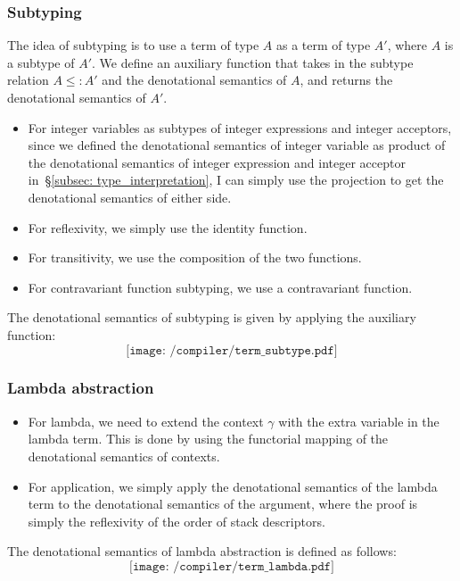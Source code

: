 \documentclass[12pt,a4paper]{report}
\theoremstyle{definition}
\newcommand{\secref}[1]{\S\ref{#1}}
\begin{document}
        \subsubsection{Subtyping}
        The idea of subtyping is to use a term of type $A$ as a term of type $A'$, where $A$ is a subtype of $A'$. We define an auxiliary function that takes in the subtype relation $A\leq:A'$ and the denotational semantics of $A$, and returns the denotational semantics of $A'$. 
        \begin{itemize}
            \item For integer variables as subtypes of integer expressions and integer acceptors, since we defined the denotational semantics of integer variable as product of the denotational semantics of integer expression and integer acceptor in~\secref{subsec: type_interpretation}, I can simply use the projection to get the denotational semantics of either side.
            \item For reflexivity, we simply use the identity function.
            \item For transitivity, we use the composition of the two functions.
            \item For contravariant function subtyping, we use a contravariant function.
        \end{itemize}
        The denotational semantics of subtyping is given by applying the auxiliary function:
        \[\texttt{[image: /compiler/term\_subtype.pdf]}\]

        \subsubsection{Lambda abstraction}
        \begin{itemize}
            \item For lambda, we need to extend the context $\gamma$ with the extra variable in the lambda term. This is done by using the functorial mapping of the denotational semantics of contexts.
            \item For application, we simply apply the denotational semantics of the lambda term to the denotational semantics of the argument, where the proof is simply the reflexivity of the order of stack descriptors.
        \end{itemize}
        The denotational semantics of lambda abstraction is defined as follows:
        \[\texttt{[image: /compiler/term\_lambda.pdf]}\]
\end{document}
